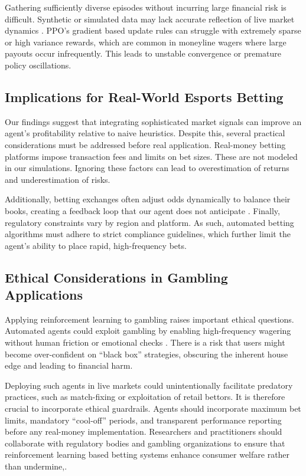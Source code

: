 \documentclass[sigconf]{acmart}
\begin{document}
Gathering sufficiently diverse episodes without incurring large financial risk is difficult. Synthetic or simulated data may lack accurate reflection of live market dynamics \cite{jansen2020rlbetting}. PPO's gradient based update rules can struggle with extremely sparse or high variance rewards, which are common in moneyline wagers where large payouts occur infrequently. This leads to unstable convergence or premature policy oscillations. 

\subsection{Implications for Real-World Esports Betting}

Our findings suggest that integrating sophisticated market signals can improve an agent's profitability relative to naive heuristics. Despite this, several practical considerations must be addressed before real application. Real-money betting platforms impose transaction fees and limits on bet sizes. These are not modeled in our simulations. Ignoring these factors can lead to overestimation of returns and underestimation of risks.

Additionally, betting exchanges often adjust odds dynamically to balance their books, creating a feedback loop that our agent does not anticipate \cite{jansen2020rlbetting}. Finally, regulatory constraints vary by region and platform. As such, automated betting algorithms must adhere to strict compliance guidelines, which further limit the agent's ability to place rapid, high-frequency bets.

\subsection{Ethical Considerations in Gambling Applications}

Applying reinforcement learning to gambling raises important ethical questions. Automated agents could exploit gambling by enabling high-frequency wagering without human friction or emotional checks \cite{king2019ethics}. There is a risk that users might become over-confident on “black box” strategies, obscuring the inherent house edge and leading to financial harm.

Deploying such agents in live markets could unintentionally facilitate predatory practices, such as match-fixing or exploitation of retail bettors. It is therefore crucial to incorporate ethical guardrails. Agents should incorporate maximum bet limits, mandatory “cool-off” periods, and transparent performance reporting before any real-money implementation. Researchers and practitioners should collaborate with regulatory bodies and gambling organizations to ensure that reinforcement learning based betting systems enhance consumer welfare rather than undermine,.
\end{document}
